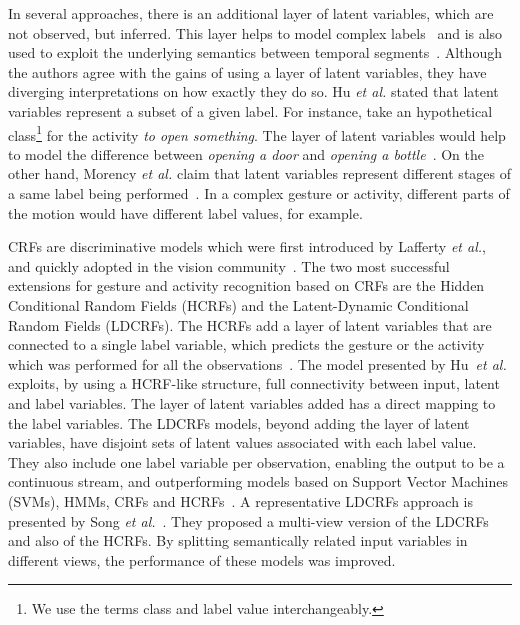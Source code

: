 \documentclass[10pt, conference]{IEEEtran}
\begin{document}
In several approaches, there is an additional layer of latent variables, which are not observed, but inferred. This layer helps  to model complex labels~\cite{hucrf,ldcrf,hcrf,hu2l,mvldcrf} and is also used to exploit the underlying semantics between temporal segments~\cite{hucrf}.
Although the authors agree with the gains of using a layer of latent variables, they have diverging interpretations on how exactly they do so. 
Hu \textit{et al.} stated that latent variables represent a subset of a given label. For instance, take an hypothetical class\footnote{We use the terms class and label value interchangeably.} for the activity \textit{to open something}. The layer of latent variables would help to model the difference between \textit{opening a door} and \textit{opening a bottle}~\cite{hucrf}.
On the other hand, Morency \textit{et al.} claim that latent variables represent different stages of a same label being performed~\cite{ldcrf}. In a complex gesture or activity, different parts of the motion would have different label values, for example.

CRFs are discriminative models which were first introduced by Lafferty \textit{et al.}, and quickly adopted in the vision community~\cite{crf}. The two most successful extensions for gesture and activity recognition based on CRFs are the Hidden Conditional Random Fields (HCRFs) and the Latent-Dynamic Conditional Random Fields (LDCRFs).
The HCRFs add a layer of latent variables that are connected to a single label variable, which predicts the gesture or the activity which was performed for all the observations~\cite{hcrf}. %
The model presented by Hu~\textit{et al.} exploits, by using a HCRF-like structure, full connectivity between input, latent and label variables. The layer of latent variables added has a direct mapping to the label variables.
The LDCRFs models, beyond adding the layer of latent variables, have disjoint sets of latent values associated with each label value. They also include one label variable per observation, enabling the output to be a continuous stream, and outperforming models based on Support Vector Machines (SVMs), HMMs, CRFs and HCRFs~\cite{ldcrf}.
A representative LDCRFs approach is presented by Song \textit{et al.}~\cite{mvldcrf}. They proposed a multi-view version of the LDCRFs and also of the HCRFs. By splitting semantically related input variables in different views, the performance of these models was improved.
\end{document}

